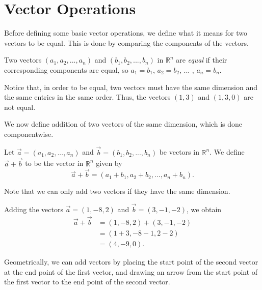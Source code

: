 \documentclass{ximera}
\begin{document}
\section{Vector Operations}

Before defining some basic vector operations, we define what it means for two vectors to be equal. This is done by comparing the components of the vectors.

\begin{definition}
Two vectors $(a_1,a_2,...,a_n)$ and $(b_1,b_2,...,b_n)$ in $\mathbb{R}^n$ are \emph{equal} if their corresponding components are equal, so $a_1=b_1$, $a_2=b_2$, ... , $a_n = b_n$.
\end{definition}

Notice that, in order to be equal, two vectors must have the same dimension and the same entries in the same order. Thus, the vectors $(1,3)$ and $(1,3,0)$ are not equal.

We now define addition of two vectors of the same dimension, which is done componentwise.

\begin{definition}
Let $\vec{a}=(a_1,a_2,...,a_n)$ and $\vec{b}=(b_1,b_2,...,b_n)$ be vectors in $\mathbb{R}^n$. We define $\vec{a}+\vec{b}$ to be the vector in $\mathbb{R}^n$ given by
\[
\vec{a}+\vec{b} = (a_1+b_1,a_2+b_2,...,a_n+b_n).
\]
\end{definition}

Note that we can only add two vectors if they have the same dimension.

\begin{example}
Adding the vectors $\vec{a} = (1,-8,2)$ and $\vec{b} = (3,-1,-2)$, we obtain
\begin{align*}
\vec{a}+\vec{b} &= (1,-8,2)+(3,-1,-2)\\
 &= (1+3,-8-1,2-2)\\
 &= (4,-9,0).
\end{align*}
\end{example}

Geometrically, we can add vectors by placing the start point of the second vector at the end point of the first vector, and drawing an arrow from the start point of the first vector to the end point of the second vector.
\end{document}
